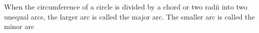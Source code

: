         When the circumference of a circle is divided by a chord or two radii into two unequal arcs, 
the larger arc is called the major arc.  The smaller arc is called the minor arc	